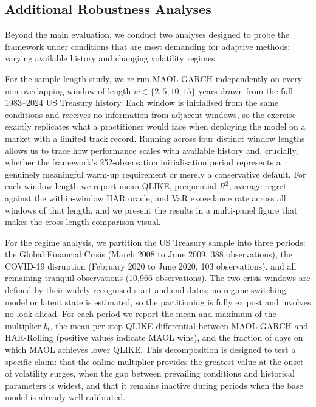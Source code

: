 \subsection{Additional Robustness Analyses}\label{sec:robustness_design}

Beyond the main evaluation, we conduct two analyses designed to probe the framework under conditions that are most demanding for adaptive methods: varying available history and changing volatility regimes.

For the sample-length study, we re-run MAOL-GARCH independently on every non-over\-lapping window of length $w \in \{2, 5, 10, 15\}$ years drawn from the full 1983--2024 US Treasury history. Each window is initialised from the same conditions and receives no information from adjacent windows, so the exercise exactly replicates what a practitioner would face when deploying the model on a market with a limited track record. Running across four distinct window lengths allows us to trace how performance scales with available history and, crucially, whether the framework's 252-observation initialisation period represents a genuinely meaningful warm-up requirement or merely a conservative default. For each window length we report mean QLIKE, prequential $R^2$, average regret against the within-window HAR oracle, and VaR exceedance rate across all windows of that length, and we present the results in a multi-panel figure that makes the cross-length comparison visual.

For the regime analysis, we partition the US Treasury sample into three periods: the Global Financial Crisis (March 2008 to June 2009, 388 observations), the COVID-19 disruption (February 2020 to June 2020, 103 observations), and all remaining tranquil observations (10,966 observations). The two crisis windows are defined by their widely recognised start and end dates; no regime-switching model or latent state is estimated, so the partitioning is fully ex post and involves no look-ahead. For each period we report the mean and maximum of the multiplier $b_t$, the mean per-step QLIKE differential between MAOL-GARCH and HAR-Rolling (positive values indicate MAOL wins), and the fraction of days on which MAOL achieves lower QLIKE. This decomposition is designed to test a specific claim: that the online multiplier provides the greatest value at the onset of volatility surges, when the gap between prevailing conditions and historical parameters is widest, and that it remains inactive during periods when the base model is already well-calibrated.
